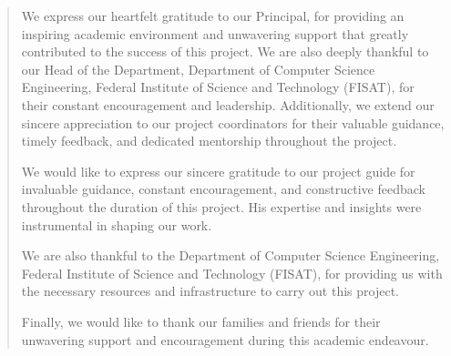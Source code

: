 \documentclass{fisatprojectfinal}
\begin{document}
\renewcommand\abstractname{ACKNOWLEDGMENT}
\begin{abstract}
\vspace{5cm}
We express our heartfelt gratitude to our Principal, for providing an inspiring academic environment and unwavering support that greatly contributed to the success of this project. We are also deeply thankful to our Head of the Department, Department of Computer Science Engineering, Federal Institute of Science and Technology (FISAT), for their constant encouragement and leadership. Additionally, we extend our sincere appreciation to our project coordinators for their valuable guidance, timely feedback, and dedicated mentorship throughout the project.

We would like to express our sincere gratitude to our project guide for invaluable guidance, constant encouragement, and constructive feedback throughout the duration of this project. His expertise and insights were instrumental in shaping our work.

We are also thankful to the Department of Computer Science Engineering, Federal Institute of Science and Technology (FISAT), for providing us with the necessary resources and infrastructure to carry out this project.

Finally, we would like to thank our families and friends for their unwavering support and encouragement during this academic endeavour.
\end{abstract}
\newpage

\restoregeometry
\tableofcontents
\newpage
\listoffigures
\newpage
\listoftables
\newpage
\end{document}
